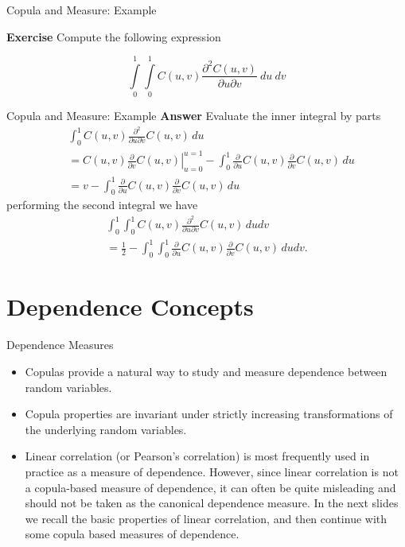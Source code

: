 \documentclass[11pt]{beamer}
\theoremstyle{plain}
\theoremstyle{definition}
\theoremstyle{remark}
\begin{document}
%
\begin{frame}{Copula and Measure: Example}

\textbf{Exercise} Compute the following expression

\begin{equation}
\int\limits_0^1 \int\limits_0^1 C(u,v) \frac{\partial^2 C(u,v)}{\partial u \partial v} \>du\>dv
\end{equation}
\end{frame}
%
\begin{frame}{Copula and Measure: Example}
	\footnotesize{
	\textbf{Answer} Evaluate the inner integral by parts
	\begin{equation}
	\begin{split}
	& \int_{0}^{1}C(u,v)\frac{\partial^2}{\partial u \partial v}C(u,v)\,du\\
	& = \left.C(u,v)\frac{\partial}{\partial v}C(u,v)\right|_{u=0}
	^{u=1}-\int_{0}^{1}\frac{\partial}{\partial u}C(u,v)\frac{\partial}{\partial v}C(u,v)\,du\\
	& =v-\int_{0}^{1}\frac{\partial}{\partial u}
	C(u,v)\frac{\partial}{\partial v}C(u,v)\,du
	\end{split}
	\end{equation}
	performing the second integral we have
	\begin{equation}
	\begin{split}
	\int_{0}^{1}\int_{0}^{1}C(u,v)\frac{\partial^2}{\partial u \partial v}C(u,v)\,dudv\\=\frac1{2}-\int_{0}^{1}\int_{0}^{1}
	\frac{\partial}{\partial u}C(u,v)\frac{\partial}{\partial v}C(u,v)\,dudv.
	\end{split}
	\end{equation}
	}
\end{frame}
\section{Dependence Concepts}

\begin{frame}{Dependence Measures}
   \begin{itemize}
    \item Copulas provide a natural way to study and measure dependence between random 
    variables. 
	\item Copula properties are invariant under strictly increasing transformations of the 
	underlying random variables. 
	\item Linear correlation (or Pearson’s correlation) is most frequently used in practice 
	as a measure of dependence. However, since linear correlation is not a copula-based 
	measure of dependence, it can often be quite misleading and should not be taken as the 
	canonical dependence measure. In the next slides we recall the basic properties of 
	linear correlation, and then continue with some copula based measures of dependence.
   \end{itemize}
\end{frame}
\end{document}
